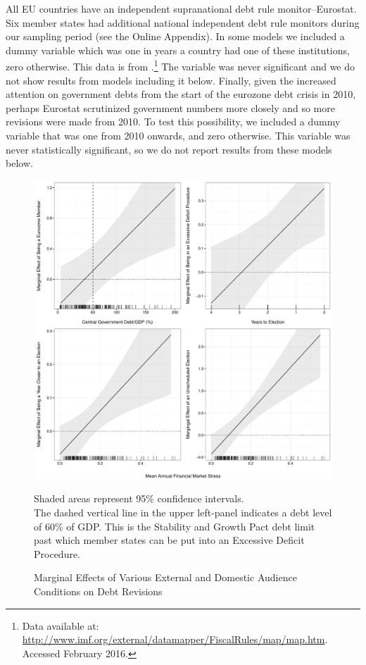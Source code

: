 \documentclass[]{article}
\begin{document}
All EU countries have an independent supranational debt rule monitor--Eurostat. Six member states had additional national independent debt rule monitors during our sampling period (see the Online Appendix). In some models we included a dummy variable which was one in years a country had one of these institutions, zero otherwise. This data is from \cite{bova2015rules}.\footnote{Data available at: \url{http://www.imf.org/external/datamapper/FiscalRules/map/map.htm}. Accessed February 2016.} The variable was never significant and we do not show results from models including it below. Finally, given the increased attention on government debts from the start of the eurozone debt crisis in 2010, perhaps Eurostat scrutinized government numbers more closely and so more revisions were made from 2010. To test this possibility, we included a dummy variable that was one from 2010 onwards, and zero otherwise. This variable was never statistically significant, so we do not report results from these models below.

\begin{figure}
    \caption{Marginal Effects of Various External and Domestic Audience Conditions on Debt Revisions}
    \label{me_comb}

    \begin{center}
        \includegraphics[scale=0.55]{figures/debt_me_comb.pdf}
    \end{center}

	{\scriptsize{Shaded areas represent 95\% confidence intervals.\\
    The dashed vertical line in the upper left-panel indicates a debt level of 60\% of GDP. This is the Stability and Growth Pact debt limit past which member states can be put into an Excessive Deficit Procedure.}}

\end{figure}
\end{document}
